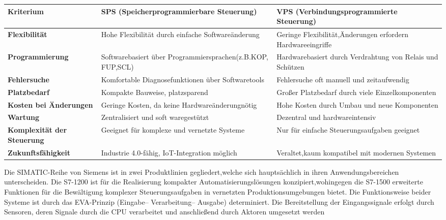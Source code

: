 \begin{center}

    \begin{tabular}{|p{4cm}|p{6cm}|p{6cm}|}
        \hline
            \textbf{Kriterium}  & \textbf{SPS (Speicherprogrammierbare Steuerung)} & \textbf{VPS (Verbindungsprogrammierte Steuerung)} \\
            \hline
            \textbf{Flexibilität}& Hohe Flexibilität durch einfache Softwareänderung& Geringe Flexibilität,Änderungen erfordern Hardwareeingriffe\\
            \hline
            \textbf{Programmierung} &  Softwarebasiert über Programmiersprachen(z.B.KOP, FUP,SCL)& Hardwarebasiert durch Verdrahtung von Relais und Schützen\\
            \hline
            \textbf{Fehlersuche}& Komfortable Diagnosefunktionen über Softwaretools& Fehlersuche oft manuell und zeitaufwendig\\
            \hline
            \textbf{Platzbedarf}& Kompakte Bauweise, platzsparend & Großer Platzbedarf durch viele Einzelkomponenten\\
            \hline
            \textbf{Kosten bei Änderungen}& Geringe Kosten, da keine Hardwareänderungnötig& Hohe Kosten durch Umbau und neue Komponenten\\
            \hline
            \textbf{Wartung}&Zentralisiert und soft waregestützt& Dezentral und hardwareintensiv  \\
            \hline
            \textbf{Komplexität der Steuerung}& Geeignet für komplexe und vernetzte Systeme & Nur für einfache Steuerungsaufgaben geeignet   \\
            \hline
            \textbf{Zukunftsfähigkeit}& Industrie 4.0-fähig, IoT-Integration möglich & Veraltet,kaum kompatibel mit modernen Systemen \\
            \hline
    \end{tabular}

    \label{tab:VergleichSpsVps}
\end{center}


Die SIMATIC-Reihe von Siemens ist in zwei Produktlinien gegliedert,welche sich
hauptsächlich in ihren Anwendungsbereichen unterscheiden. Die S7-1200 ist für die
Realisierung kompakter Automatisierungslösungen konzipiert,wohingegen die S7-1500
erweiterte Funktionen für die Bewältigung komplexer Steuerungsaufgaben in vernetzten
Produktionsumgebungen bietet. Die Funktionsweise beider Systeme ist durch das
EVA-Prinzip (Eingabe– Verarbeitung– Ausgabe) determiniert. Die Bereitstellung der
Eingangssignale erfolgt durch Sensoren, deren Signale durch die CPU verarbeitet und
anschließend durch Aktoren umgesetzt werden


